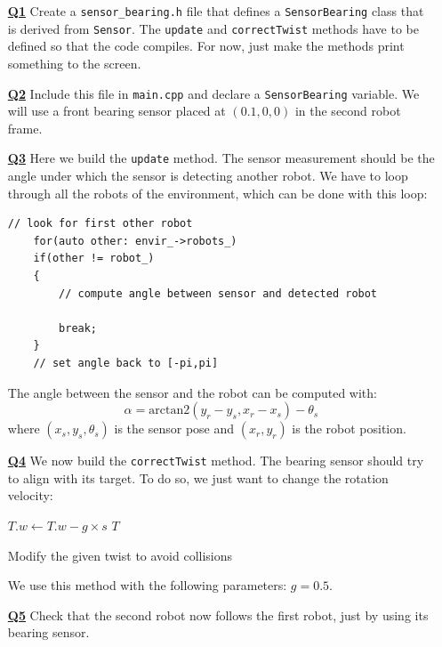 \documentclass{ecnreport}
\begin{document}
\begin{itemize}
\medskip\item[\textbf{\underline{Q1}}] Create a \texttt{sensor\_bearing.h} file that defines a \texttt{SensorBearing} class that is derived from \texttt{Sensor}. The \texttt{update} and \texttt{correctTwist} methods have to be defined so that the code compiles. For now, just make the methods print something to the screen.

\medskip\item[\textbf{\underline{Q2}}] Include this file in \texttt{main.cpp} and declare a \texttt{SensorBearing} variable.  We will use a front bearing sensor placed at $(0.1, 0,0)$ in the second robot frame.

\medskip\item[\textbf{\underline{Q3}}] Here we build the \texttt{update} method. The sensor measurement should be the angle under which the sensor is detecting another robot. 
We have to loop through all the robots of the environment, which can be done with this loop:
\begin{center}\cppstyle
\begin{lstlisting}
// look for first other robot
    for(auto other: envir_->robots_)
	if(other != robot_)
	{
	    // compute angle between sensor and detected robot
	    
	    break;
	}
    // set angle back to [-pi,pi]
\end{lstlisting}
\end{center}
The angle between the sensor and the robot can be computed with:
\begin{equation*}
 \alpha = \text{arctan2}(y_r - y_s, x_r-x_s) - \theta_s
\end{equation*}where $(x_s,y_s,\theta_s)$ is the sensor pose and $(x_r,y_r)$ is the robot position.

\medskip\item[\textbf{\underline{Q4}}] We now build the \texttt{correctTwist} method. The bearing sensor should try to align with its target. To do so, we just want to change the rotation velocity:
\begin{algorithm}[!h]
{}
$T.w \gets T.w - g\times s$\;
\Return $T$
\caption{Modify the given twist to avoid collisions}
\label{algo:bearing}
\end{algorithm}

We use this method with the following parameters: $g = 0.5$.


\medskip\item[\textbf{\underline{Q5}}] Check that the second robot now follows the first robot, just by using its bearing sensor. 

\end{itemize}
\end{document}
